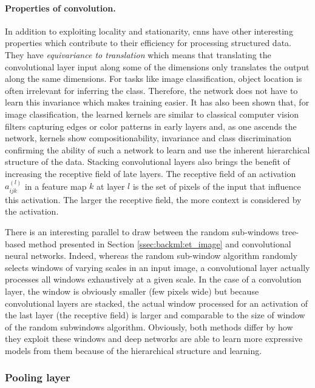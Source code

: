 \paragraph{Properties of convolution.} In addition to exploiting locality and 
stationarity, \acrshort{cnn}s have other
interesting properties which contribute to their efficiency for processing structured
data. They have \textit{equivariance to translation} which means that translating
the convolutional layer input along some of the dimensions only translates the
output along the same dimensions. For tasks like image classification, object
location is often irrelevant for inferring the class. Therefore, the network does
not have to learn this invariance which makes training easier. It has also been
shown that, for image classification, the learned kernels are similar to classical
computer vision filters capturing edges or color patterns in early layers and, as
one ascends the network, kernels show compositionability, invariance and class
discrimination \cite{zeiler2014visualizing} confirming the ability of such
a network to learn and use the inherent hierarchical structure of the data. Stacking
convolutional layers also brings the benefit of increasing the receptive field of
late layers. The receptive field of an activation $a^{(l)}_{ijk}$ in a feature
map $k$ at layer $l$ is the set of pixels of the input that influence this
activation. The larger the receptive field, the more context is considered by the
activation.

There is an interesting parallel to draw between the random sub-windows tree-based method presented in Section \ref{ssec:backml:et_image} and convolutional neural networks. Indeed, whereas the random sub-window algorithm randomly selects windows of varying scales in an input image, a convolutional layer actually processes all windows exhaustively at a given scale. In the case of a convolution layer, the window is obviously smaller (\ie few pixels wide) but because convolutional layers are stacked, the actual window processed for an activation of the last layer (\ie the receptive field) is larger and comparable to the size of window of the random subwindows algorithm. Obviously, both methods differ by how they exploit these windows and deep networks are able to learn more expressive models from them because of the hierarchical structure and learning. 

\subsubsection{Pooling layer}
\label{sssec:backml:poolinglayer}

